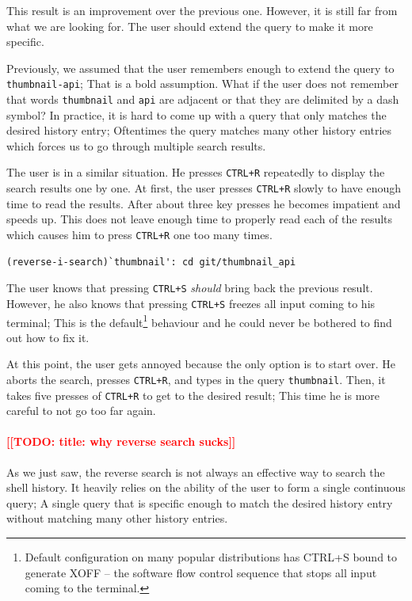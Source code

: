 \documentclass[thesis=M,english]{FITthesis}[2012/10/20]
\newcommand{\redtext}[1]{\textcolor{red}{[[#1]]}}
\begin{document}
This result is an improvement over the previous one. However, it is still far from what we are looking for. The user should extend the query to make it more specific. 

Previously, we assumed that the user remembers enough to extend the query to \verb|thumbnail-api|; That is a bold assumption. What if the user does not remember that words \verb|thumbnail| and \verb|api| are adjacent or that they are delimited by a dash symbol? In practice, it is hard to come up with a query that only matches the desired history entry; Oftentimes the query matches many other history entries which forces us to go through multiple search results.


The user is in a similar situation. He presses \verb|CTRL+R| repeatedly to display the search results one by one. At first, the user presses \verb|CTRL+R| slowly to have enough time to read the results. After about three key presses he becomes impatient and speeds up. This does not leave enough time to properly read each of the results which causes him to press \verb|CTRL+R| one too many times.

\begin{verbatim}
(reverse-i-search)`thumbnail': cd git/thumbnail_api
\end{verbatim}

The user knows that pressing \verb|CTRL+S| \textit{should} bring back the previous result. However, he also knows that pressing \verb|CTRL+S| freezes all input coming to his terminal; This is the default\footnote{Default configuration on many popular distributions has CTRL+S bound to generate XOFF -- the software flow control sequence that stops all input coming to the terminal.} behaviour and he could never be bothered to find out how to fix it.

At this point, the user gets annoyed because the only option is to start over. He aborts the search, presses \verb|CTRL+R|, and types in the query \verb|thumbnail|. Then, it takes five presses of \verb|CTRL+R| to get to the desired result; This time he is more careful to not go too far again.


\paragraph{\redtext{TODO: title: why reverse search sucks}}

As we just saw, the reverse search is not always an effective way to search the shell history. It heavily relies on the ability of the user to form a single continuous query; A single query that is specific enough to match the desired history entry without matching many other history entries. 
\end{document}
